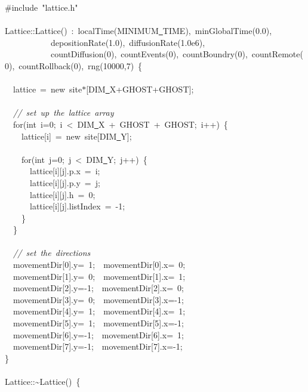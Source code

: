 {\ttfamily \raggedright \small
\#include\ "{}lattice.h"{}\\
\ \\
Lattice::Lattice()\ :\ localTime(MINIMUM\underline\ TIME),\ minGlobalTime(0.0),\\
\ \ \ \ \ \ \ \ \ \ \ depositionRate(1.0),\ diffusionRate(1.0e6),\\
\ \ \ \ \ \ \ \ \ \ \ countDiffusion(0),\ countEvents(0),\ countBoundry(0),\ countRemote(0),\ countRollback(0),\ rng(10000,7)\ \{\\
\ \\
\ \ lattice\ =\ new\ site$\ast$[DIM\underline\ X+GHOST+GHOST];\\
\ \\
\ \ \textsl{//\ set\ up\ the\ lattice\ array}\\
\ \ for(int\ i=0;\ i\ <{}\ DIM\underline\ X\ +\ GHOST\ +\ GHOST;\ i++)\ \{\\
\ \ \ \ lattice[i]\ =\ new\ site[DIM\underline\ Y];\\
\ \ \ \ \\
\ \ \ \ for(int\ j=0;\ j\ <{}\ DIM\underline\ Y;\ j++)\ \{\\
\ \ \ \ \ \ lattice[i][j].p.x\ =\ i;\\
\ \ \ \ \ \ lattice[i][j].p.y\ =\ j;\\
\ \ \ \ \ \ lattice[i][j].h\ =\ 0;\\
\ \ \ \ \ \ lattice[i][j].listIndex\ =\ -{}1;\\
\ \ \ \ \}\\
\ \ \}\\
\ \\
\ \ \textsl{//\ set\ the\ directions}\\
\ \ movementDir[0].y=\ 1;\ \ movementDir[0].x=\ 0;\\
\ \ movementDir[1].y=\ 0;\ \ movementDir[1].x=\ 1;\\
\ \ movementDir[2].y=-{}1;\ \ movementDir[2].x=\ 0;\\
\ \ movementDir[3].y=\ 0;\ \ movementDir[3].x=-{}1;\\
\ \ movementDir[4].y=\ 1;\ \ movementDir[4].x=\ 1;\\
\ \ movementDir[5].y=\ 1;\ \ movementDir[5].x=-{}1;\\
\ \ movementDir[6].y=-{}1;\ \ movementDir[6].x=\ 1;\\
\ \ movementDir[7].y=-{}1;\ \ movementDir[7].x=-{}1;\\
\}\\
\ \\
Lattice::\textasciitilde Lattice()\ \{\\
}
